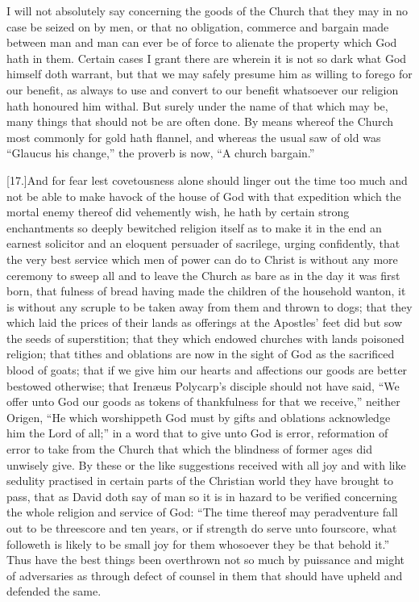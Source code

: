 I will not absolutely say concerning the goods of the Church that they may in no case be seized on by men, or that no obligation, commerce and bargain made between man and man can ever be of force to alienate the property which God hath in them. Certain cases I grant there are wherein it is not so dark what God himself doth warrant, but that we may safely presume him as willing to forego for our benefit, as always to use and convert to our benefit whatsoever our religion hath honoured him withal. But surely under the name of that which may be, many things that should not be are often done. By means whereof the Church most commonly for gold hath flannel, and whereas the usual saw of old was “Glaucus his change,” the proverb is now, “A church bargain.”

[17.]And for fear lest covetousness alone should linger out the time too much and not be able to make havock of the house of God with that expedition which the mortal enemy thereof did vehemently wish, he hath by certain strong enchantments so deeply bewitched religion itself as to make it in the end an earnest solicitor and an eloquent persuader of sacrilege, urging confidently, that the very best service which men of power can do to Christ is without any more ceremony to sweep all and to leave the Church as bare as in the day it was first born, that fulness of bread having made the children of the household wanton, it is without any scruple to be taken away from them and thrown to dogs; that they which laid the prices of their lands as offerings at the Apostles’ feet did but sow the seeds of superstition; that they which endowed churches with lands poisoned religion; that tithes and oblations are now in the sight of God as the sacrificed blood of goats; that if we give him our hearts and affections our goods are better bestowed otherwise; that Irenæus Polycarp’s disciple should not have said, “We offer unto God our goods as tokens of thankfulness for that we receive,” neither Origen, “He which worshippeth God must by gifts and oblations acknowledge him the Lord of  all;”
 in a word that to give unto God is error, reformation of error to take from the Church that which the blindness of former ages did unwisely give. By these or the like suggestions received with all joy and with like sedulity practised in certain parts of the Christian world they have brought to pass, that as David doth say of man so it is in hazard to be verified concerning the whole religion and service of God: “The time thereof may peradventure fall out to be threescore and ten years, or if strength do serve unto fourscore, what followeth is likely to be small joy for them whosoever they be that behold it.” Thus have the best things been overthrown not so much by puissance and might of adversaries as through defect of counsel in them that should have upheld and defended the same.


